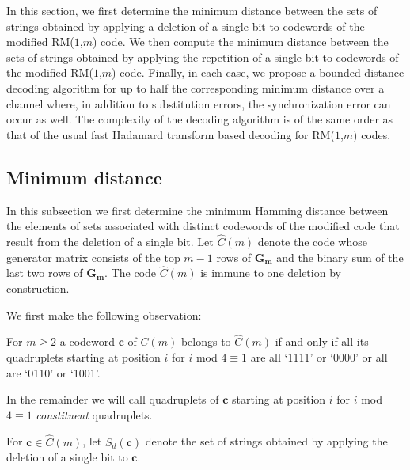 In this section, we first determine the minimum distance between
the sets of strings obtained by applying a deletion of a single
bit to codewords of the modified RM($1$,$m$) code. We then compute
the minimum distance between the sets of strings obtained by
applying the repetition of a single bit to codewords of the
modified RM($1$,$m$) code. Finally, in each case, we propose a
bounded distance decoding algorithm for up to half the
corresponding minimum distance over a channel where, in addition
to substitution errors, the synchronization error can occur as
well. The complexity of the decoding algorithm is of the same
order as that of the usual fast Hadamard transform based decoding
for RM($1$,$m$) codes.

\subsection{Minimum distance}\label{sectionmd}

In this subsection we first determine the minimum Hamming distance
between the elements of sets associated with distinct codewords of
the modified code that result from the deletion of a single bit.
Let $\hat{C}(m)$ denote the code whose generator matrix consists
of the top $m-1$ rows of $\mathbf{G_m}$ and the binary sum of the
last two rows of $\mathbf{G_m}$. The code $\hat{C}(m)$ is immune
to one deletion by construction.

We first make the following observation:
\begin{remark}\label{RE1}
For $m \geq 2$ a codeword $\mathbf{c}$ of $C(m)$ belongs to
$\hat{C}(m)$ if and only if all its quadruplets starting at
position $i$ for $i $ mod $4 \equiv 1$ are all `1111' or `0000' or
all are `0110' or `1001'.
\end{remark}
In the remainder we will call quadruplets of $\mathbf{c}$ starting
at position $i$ for $i $ mod $4 \equiv 1$ \textit{constituent}
quadruplets.

For $\mathbf{c} \in \hat{C}(m)$, let $S_d(\mathbf{c})$ denote the
set of strings obtained by applying the deletion of a single bit
to $\mathbf{c}$.

